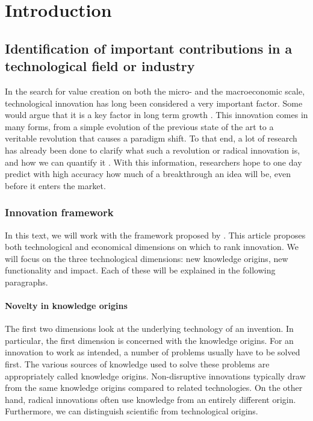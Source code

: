 \chapter{Introduction}\label{chap:intro}
\section{Identification of important contributions in a technological field or industry}
In the search for value creation on both the micro- and the macroeconomic scale,
technological innovation has long been considered a very important factor. Some
would argue that it is a key factor in long term growth \cite{arts}. This
innovation comes in many forms, from a simple evolution of the previous state of
the art to a veritable revolution that causes a paradigm shift. To that end, a
lot of research has already been done to clarify what such a revolution or
radical innovation is, and how we can quantify it \cite{structure, invention,
verhoeven}. With this information, researchers hope to one day predict with
high accuracy how much of a breakthrough an idea will be, even before it enters
the market.

\subsection{Innovation framework}
In this text, we will work with the framework proposed by \cite{verhoeven}.
This article proposes both technological and economical dimensions on which to
rank innovation. We will focus on the three technological dimensions: new
knowledge origins, new functionality and impact. Each of these will be explained
in the following paragraphs.

\subsubsection{Novelty in knowledge origins}
The first two dimensions look at the underlying technology of an invention. In
particular, the first dimension is concerned with the knowledge origins. For an
innovation to work as intended, a number of problems usually have to be solved
first. The various sources of knowledge used to solve these problems are
appropriately called knowledge origins. Non-disruptive innovations typically
draw from the same knowledge origins compared to related technologies. On the
other hand, radical innovations often use knowledge from an entirely different
origin. Furthermore, we can distinguish scientific from technological origins.

